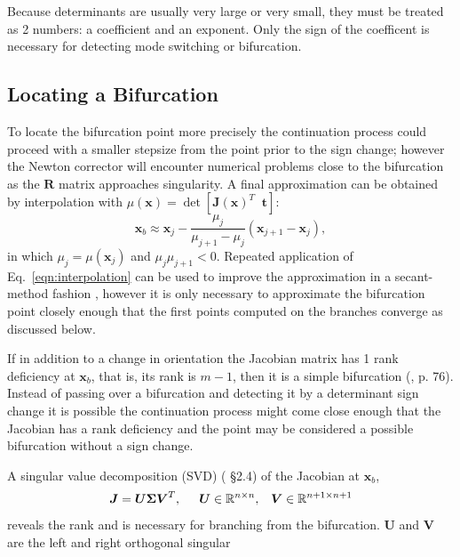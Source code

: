 \documentclass[10pt,openany,twoside]{book}
\numberwithin{equation}{section}   %
\newcommand{\Matrix}[1]{\boldsymbol{#1}}
\newcommand{\Vector}[1]{\boldsymbol{#1}}
\newcommand{\Eqn}[1]{Eq.\ \ref{#1}}
\begin{document}
Because determinants are usually very large or very small, they must
be treated as 2 numbers: a coefficient and an exponent. Only the sign
of the coefficent is necessary for detecting mode switching or bifurcation.

\subsection{Locating a Bifurcation}
To locate the bifurcation point more precisely the
continuation process could proceed with a smaller stepsize from
the point prior to the sign change; however the Newton corrector will
encounter numerical problems close to the bifurcation as the $\Matrix{R}$
matrix approaches singularity. A final approximation can be obtained by
interpolation with
	$\mu(\Vector{x}) = \det\left[\Matrix{J}(\Vector{x})^T \;\; \Vector{t}\right]$:
\begin{equation}
\label{eqn:interpolation}
\Vector{x}_b \approx \Vector{x}_j - \frac{\mu_j}{\mu_{j+1}
	- \mu_j}\left( \Vector{x}_{j+1} - \Vector{x}_j\right),
\end{equation}
in which $\mu_j = \mu(\Vector{x}_j)$ and $\mu_j\mu_{j+1} < 0$.
Repeated application of \Eqn{eqn:interpolation} can be used to
improve the approximation in a secant-method fashion \cite{keller1987lectures},
however it is only necessary to approximate the bifurcation
point closely enough that the first points computed on the
branches converge as discussed below.
\par
If in addition to a change in orientation the 
Jacobian matrix has 1 rank deficiency at $\Vector{x}_b$, that is,
its rank is $m-1$,
then it is a simple bifurcation (\cite{allgower1990numerical}, p. 76).
Instead of passing over a bifurcation and detecting it by a determinant sign
change it is possible the continuation process might come close enough
that the Jacobian has a rank deficiency and the point may be considered
a possible bifurcation without a sign change.
\par
A singular value decomposition (SVD) (\cite{golub2013matrix} \S 2.4)
of the Jacobian at $\Vector{x}_b$,
\begin{equation}
\Matrix{J} = \Matrix{U}\Matrix{\Sigma}\Matrix{V}^T, \hspace{0.2in} 
	\Matrix{U} \in \mathbb{R}^{n \times n}, \;\;\;
	\Matrix{V} \in \mathbb{R}^{n+1 \times n+1}		\nonumber
\end{equation}
reveals the rank and is necessary for branching from the bifurcation.
$\Matrix{U}$ and $\Matrix{V}$ are the left and right orthogonal singular
\end{document}
